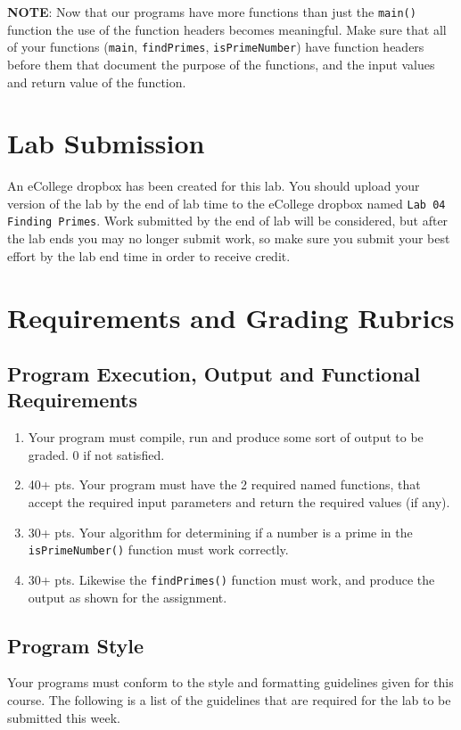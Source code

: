\documentclass[11pt]{article}
\begin{document}
\textbf{NOTE}: Now that our programs have more functions than just the \verb~main()~
function the use of the function headers becomes meaningful.  Make sure
that all of your functions (\verb~main~, \verb~findPrimes~, \verb~isPrimeNumber~)
have function headers before them that document the purpose of the
functions, and the input values and return value of the function. 
\section*{Lab Submission}
\label{sec-4}


An eCollege dropbox has been created for this lab.  You should
upload your version of the lab by the end of lab time to the eCollege
dropbox named \verb~Lab 04 Finding Primes~.  Work submitted by the end
of lab will be considered, but after the lab ends you may no longer
submit work, so make sure you submit your best effort by the lab end
time in order to receive credit.
\section*{Requirements and Grading Rubrics}
\label{sec-5}
\subsection*{Program Execution, Output and Functional Requirements}
\label{sec-5-1}


\begin{enumerate}
\item Your program must compile, run and produce some sort of output to be
  graded. 0 if not satisfied.
\item 40+ pts.  Your program must have the 2 required named functions, that 
   accept the required input parameters and return the required values
   (if any).
\item 30+ pts. Your algorithm for determining if a number is a prime in the
   \verb~isPrimeNumber()~ function must work correctly.
\item 30+ pts. Likewise the \verb~findPrimes()~ function must work, and produce
   the output as shown for the assignment.
\end{enumerate}
\subsection*{Program Style}
\label{sec-5-2}


Your programs must conform to the style and formatting guidelines given for this course.
The following is a list of the guidelines that are required for the lab to be submitted
this week.
\end{document}
